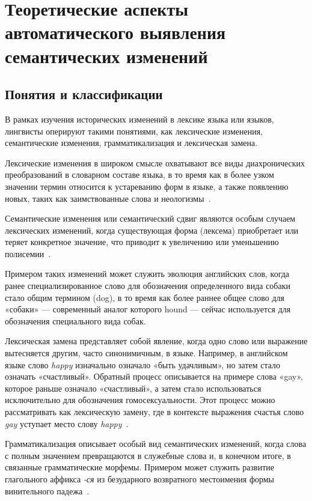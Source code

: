 \documentclass[LI,VKR]{HSEUniversity}
\begin{document}
\chapter{Теоретические аспекты автоматического выявления семантических изменений}

\section{Понятия и классификации}

В рамках изучения исторических изменений в лексике языка или языков, лингвисты оперируют
такими понятиями, как лексические изменения, семантические изменения,
грамматикализация и лексическая замена.

Лексические изменения в широком смысле охватывают все виды диахронических преобразований
в словарном составе языка, в то время как в более узком значении термин относится к
устареванию форм в языке, а также появлению новых, таких как заимствованные слова
и неологизмы~\cite{TahmasebiComputationalApproachesToSemanticChange}.

Семантические изменения или семантический сдвиг являются особым случаем лексических изменений,
когда существующая форма (лексема) приобретает или теряет конкретное значение,
что приводит к увеличению или уменьшению полисемии~\cite{TahmasebiComputationalApproachesToSemanticChange}.

Примером таких изменений может служить эволюция английских слов, когда ранее специализированное
слово для обозначения определенного вида собаки стало общим термином (dog),
в то время как более раннее общее слово для «собаки» — современный аналог которого
hound — сейчас используется для обозначения специального вида собак.

Лексическая замена представляет собой явление, когда одно слово или выражение вытесняется другим,
часто синонимичным, в языке.
Например, в английском языке слово \textit{happy} изначально означало «быть удачливым»,
но затем стало означать «счастливый».
Обратный процесс описывается на примере слова «gay», которое раньше означало «счастливый»,
а затем стало использоваться исключительно для обозначения гомосексуальности.
Этот процесс можно рассматривать как лексическую замену,
где в контексте выражения счастья слово \textit{gay}
уступает место слову \textit{happy}~\cite{TahmasebiComputationalApproachesToSemanticChange, Periti2024AnalyzingLexicalReplacements}.

Грамматикализация описывает особый вид семантических изменений, когда слова с
полным значением превращаются в служебные слова и, в конечном итоге,
в связанные грамматические морфемы.
Примером может служить развитие глагольного аффикса \textit{-ся} из
безударного возвратного местоимения формы винительного
падежа~\cite{TahmasebiComputationalApproachesToSemanticChange, Maysak2016}.
\end{document}
